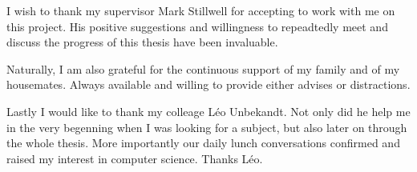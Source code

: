 I wish to thank my supervisor Mark Stillwell for accepting to work with me on
this project. His positive suggestions and willingness to repeadtedly meet and
discuss the progress of this thesis have been invaluable.

Naturally, I am also grateful for the continuous support of my family and of my
housemates. Always available and willing to provide either advises or
distractions.

Lastly I would like to thank my colleage L\'eo Unbekandt. Not only did he help
me in the very begenning when I was looking for a subject, but also later on
through the whole thesis. More importantly our daily lunch conversations
confirmed and raised my interest in computer science. Thanks L\'eo.
